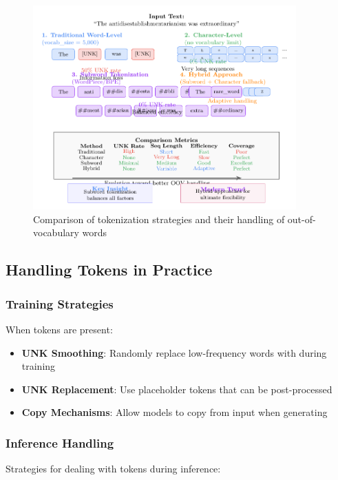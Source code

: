 \begin{figure}[h]
\centering
\includegraphics[width=0.9\textwidth]{part1/chapter02/fig_tokenization_comparison.pdf}
\caption{Comparison of tokenization strategies and their handling of out-of-vocabulary words}
\end{figure}

\subsection{Handling \unk{} Tokens in Practice}

\subsubsection{Training Strategies}
When \unk{} tokens are present:

\begin{itemize}
\item \textbf{UNK Smoothing}: Randomly replace low-frequency words with \unk{} during training
\item \textbf{UNK Replacement}: Use placeholder tokens that can be post-processed
\item \textbf{Copy Mechanisms}: Allow models to copy from input when generating \unk{}
\end{itemize}

\subsubsection{Inference Handling}
Strategies for dealing with \unk{} tokens during inference:

